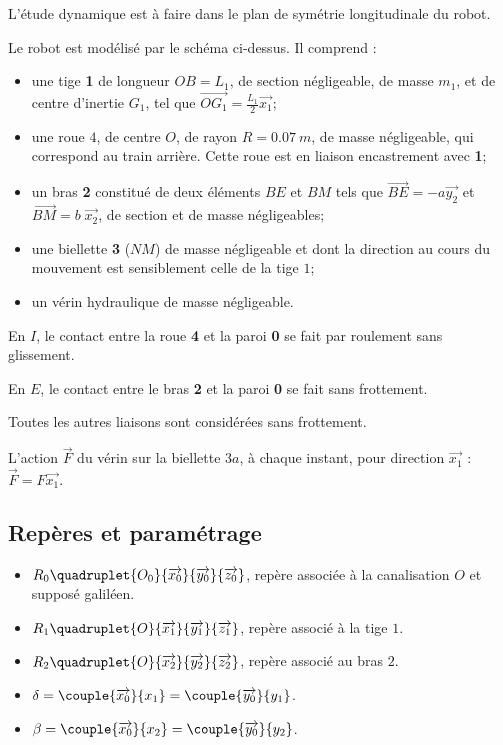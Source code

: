 \begin{multicols}{2}
L'étude dynamique est à faire dans le plan de symétrie longitudinale du robot.

Le robot est modélisé par le schéma ci-dessus. Il comprend :
\begin{itemize}
\item une tige \textbf{1} de longueur $OB=L_1$, de section négligeable, de masse $m_1$, et de centre d'inertie $G_1$, tel que $\overrightarrow{OG_1}=\frac{L_1}{2}\overrightarrow{x_1}$;
\item une roue $4$, de centre $O$, de rayon $R = \SI{0,07}{m}$, de masse négligeable, qui
correspond au train arrière. Cette roue est en liaison encastrement avec \textbf{1};
\item un bras \textbf{2} constitué de deux éléments $BE$ et $BM$ tels que $\overrightarrow{BE}=-a\overrightarrow{y_2}$ et $\overrightarrow{BM}=b\;\overrightarrow{x_2}$, de section et de masse négligeables;
\item une biellette \textbf{3} ($NM$) de masse négligeable et dont la direction au cours
du mouvement est sensiblement celle de la tige $1$;
\item un vérin hydraulique de masse négligeable.
\end{itemize}

 En $I$, le contact entre la roue \textbf{4} et la paroi \textbf{0} se fait par roulement sans glissement.

 En $E$, le contact entre le bras \textbf{2} et la paroi \textbf{0} se fait sans frottement.

Toutes les autres liaisons sont considérées sans frottement.

 L'action $\overrightarrow{F}$ du vérin sur la biellette $3a$, à chaque instant, pour direction $\overrightarrow{x_1}$ : 
$\overrightarrow{F} = F \overrightarrow{x_1}.$

\fi

\subsection*{Repères et paramétrage}
\ifprof
\else

\begin{itemize}
\item $R_0\quadruplet{O_0}{\overrightarrow{x_0}}{\overrightarrow{y_0}}{\overrightarrow{z_0}}$, repère associée à la canalisation $O$ et supposé galiléen.
\item $R_1\quadruplet{O}{\overrightarrow{x_1}}{\overrightarrow{y_1}}{\overrightarrow{z_1}}$, repère associé à la tige $1$.
\item $R_2\quadruplet{O}{\overrightarrow{x_2}}{\overrightarrow{y_2}}{\overrightarrow{z_2}}$, repère associé au bras $2$.
\item $\delta=\couple{\overrightarrow{x_0}}{{x_1}}=\couple{\overrightarrow{y_0}}{{y_1}}$.
\item $\beta=\couple{\overrightarrow{x_0}}{{x_2}}=\couple{\overrightarrow{y_0}}{{y_2}}$.
\end{itemize}


\end{multicols}

